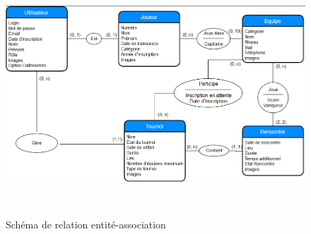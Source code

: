 \documentclass[12pt]{report}
\begin{document}
        \begin{figure}[!h]
			\centering
				\includegraphics[height=9cm]{figures/bdd-rapport-1.png}
			\caption{Schéma de relation entité-association}
		\end{figure}
		
\end{document}
